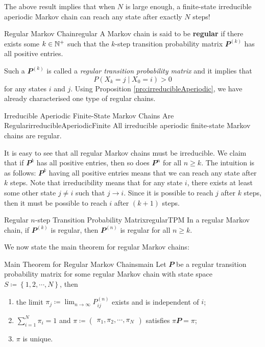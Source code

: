 \documentclass[math, code]{amznotes}
\theoremstyle{remark}
\begin{document}
The above result implies that when $N$ is large enough, a finite-state irreducible aperiodic Markov chain can reach any state after exactly $N$ steps!
\begin{dfnbox}{Regular Markov Chain}{regular}
    A Markov chain is said to be {\color{red} \textbf{regular}} if there exists some $k \in \mathbb{N}^+$ such that the $k$-step transition probability matrix $\mathbfit{P}^{\left(k\right)}$ has all positive entries.
\end{dfnbox}
Such a $\mathbfit{P}^{\left(k\right)}$ is called a \textit{regular transition probability matrix} and it implies that 
\begin{equation*}
    P\left(X_k = j \mid X_0 = i\right) > 0
\end{equation*}
for any states $i$ and $j$. Using Proposition \ref{pro:irreducibleAperiodic}, we have already characterised one type of regular chains.
\begin{probox}{\small Irreducible Aperiodic Finite-State Markov Chains Are Regular}{irreducibleAperiodicFinite}
    All irreducible aperiodic finite-state Markov chains are regular.
\end{probox}
It is easy to see that all regular Markov chains must be irreducible. We claim that if $\mathbfit{P}^k$ has all positive entries, then so does $\mathbfit{P}^{n}$ for all $n \geq k$. The intuition is as follows: $\mathbfit{P}^k$ having all positive entries means that we can reach any state after $k$ steps. Note that irreducibility means that for any state $i$, there exists at least some other state $j \neq i$ such that $j \to i$. Since it is possible to reach $j$ after $k$ steps, then it must be possible to reach $i$ after $\left(k + 1\right)$ steps.
\begin{probox}{Regular $n$-step Transition Probability Matrix}{regularTPM}
    In a regular Markov chain, if $\mathbfit{P}^{\left(k\right)}$ is regular, then $\mathbfit{P}^{\left(n\right)}$ is regular for all $n \geq k$.
\end{probox}
We now state the main theorem for regular Markov chains:
\begin{thmbox}{Main Theorem for Regular Markov Chains}{main}
    Let $\mathbfit{P}$ be a regular transition probability matrix for some regular Markov chain with state space $S \coloneqq \left\{1, 2, \cdots, N\right\}$, then 
    \begin{enumerate}
        \item the limit $\pi_j \coloneqq \lim_{n \to \infty}P^{\left(n\right)}_{ij}$ exists and is independent of $i$;
        \item $\sum_{i = 1}^{N}\pi_i = 1$ and $\pi \coloneqq \begin{pmatrix}
            \pi_1, \pi_2, \cdots, \pi_N
        \end{pmatrix}$ satisfies $\pi\mathbfit{P} = \pi$;
        \item $\pi$ is unique.
    \end{enumerate}
\end{thmbox}
\end{document}
